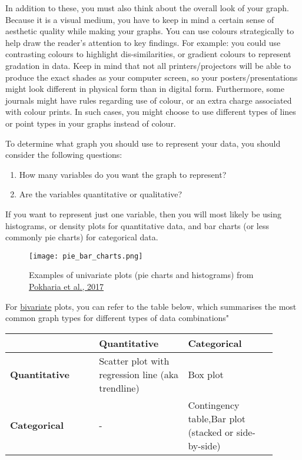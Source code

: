 \documentclass{article}
\begin{document}
In addition to these, you must also think about the overall look of your graph. Because it is a visual medium, you have to keep in mind a certain sense of aesthetic quality while making your graphs. You can use colours strategically to help draw the reader’s attention to key findings. For example: you could use contrasting colours to highlight dis-similarities, or gradient colours to represent gradation in data. Keep in mind that not all printers/projectors will be able to produce the exact shades as your computer screen, so your posters/presentations might look different in physical form than in digital form. Furthermore, some journals might have rules regarding use of colour, or an extra charge associated with colour prints. In such cases, you might choose to use different types of lines or point types in your graphs instead of colour.

To determine what graph you should use to represent your data, you should consider the following questions:
\begin{enumerate}
    \item How many variables do you want the graph to represent?
    \item Are the variables quantitative or qualitative?
\end{enumerate}

If you want to represent just one variable, then you will most likely be using histograms, or density plots for quantitative data, and bar charts (or less commonly pie charts) for categorical data.

\begin{figure}[hbt!]
    \centering
    \texttt{[image: pie\_bar\_charts.png]}
    \caption{Examples of univariate plots (pie charts and histograms) from \protect\hyperlink{pokharia}{Pokharia et al., 2017}}
    \label{fig:pokharia_plot}
\end{figure}

\newpage
For \underline{bivariate} plots, you can refer to the table below, which summarises the most common graph types for different types of data combinations"

\begin{center}
    \begin{tabular}{|>{\centering\arraybackslash}p{0.3\linewidth} | >{\centering\arraybackslash}p{0.3\linewidth}| >{\centering\arraybackslash}p{0.3\linewidth}|}
    \hline
         & \textbf{Quantitative} & \textbf{Categorical} \\
         \hline
     \textbf{Quantitative} & Scatter plot with regression line (aka trendline) & Box plot\\
     \hline
     \textbf{Categorical} & - & Contingency table,Bar plot (stacked or side-by-side)\\
     \hline
    \end{tabular}
\end{center}
\end{document}
